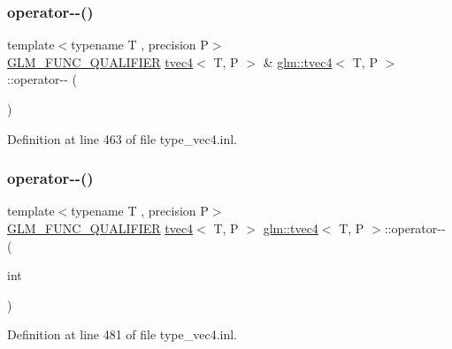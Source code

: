 \mbox{\label{structglm_1_1tvec4_acf7152ff69c44483a6dcaa29926d25a3}} 
\subsubsection{\texorpdfstring{operator-\/-\/()}{operator--()}\hspace{0.1cm}{\footnotesize\ttfamily [1/2]}}
{\footnotesize\ttfamily template$<$typename T , precision P$>$ \\
\mbox{\hyperlink{setup_8hpp_a33fdea6f91c5f834105f7415e2a64407}{G\+L\+M\+\_\+\+F\+U\+N\+C\+\_\+\+Q\+U\+A\+L\+I\+F\+I\+ER}} \mbox{\hyperlink{structglm_1_1tvec4}{tvec4}}$<$ T, P $>$ \& \mbox{\hyperlink{structglm_1_1tvec4}{glm\+::tvec4}}$<$ T, P $>$\+::operator-\/-\/ (\begin{DoxyParamCaption}{ }\end{DoxyParamCaption})}



Definition at line 463 of file type\+\_\+vec4.\+inl.

\mbox{\label{structglm_1_1tvec4_a57ff0a19184c138fab896a0f1743d442}} 
\subsubsection{\texorpdfstring{operator-\/-\/()}{operator--()}\hspace{0.1cm}{\footnotesize\ttfamily [2/2]}}
{\footnotesize\ttfamily template$<$typename T , precision P$>$ \\
\mbox{\hyperlink{setup_8hpp_a33fdea6f91c5f834105f7415e2a64407}{G\+L\+M\+\_\+\+F\+U\+N\+C\+\_\+\+Q\+U\+A\+L\+I\+F\+I\+ER}} \mbox{\hyperlink{structglm_1_1tvec4}{tvec4}}$<$ T, P $>$ \mbox{\hyperlink{structglm_1_1tvec4}{glm\+::tvec4}}$<$ T, P $>$\+::operator-\/-\/ (\begin{DoxyParamCaption}\item[{int}]{ }\end{DoxyParamCaption})}



Definition at line 481 of file type\+\_\+vec4.\+inl.

